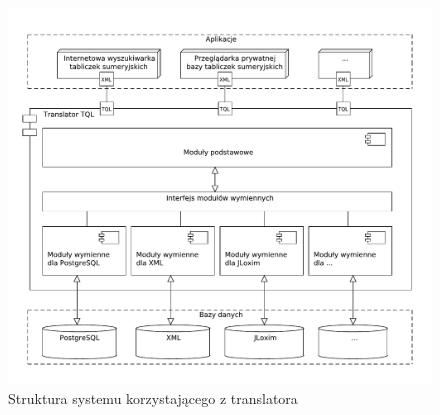 \begin{figure}[h]
 \centering
 \includegraphics[width=450px,bb=0 0 608 517]{../diagramy/struktura2.pdf}
 \caption{Struktura systemu korzystającego z translatora}
 \label{struktura_systemu}
\end{figure}

